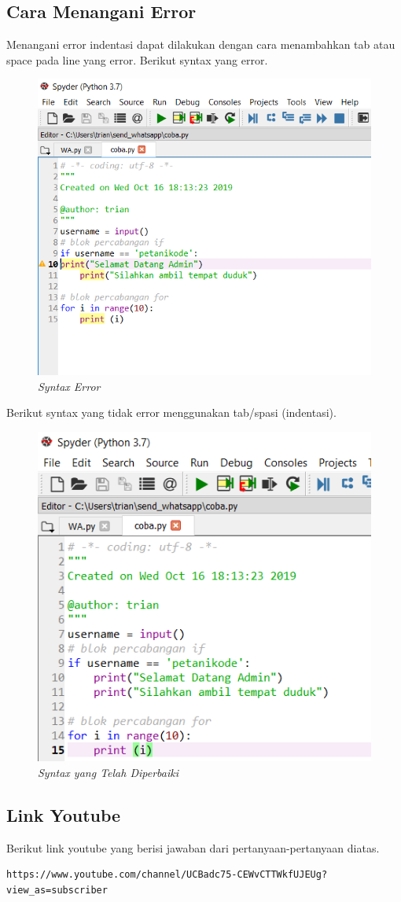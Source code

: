 \subsection{Cara Menangani Error}
Menangani error indentasi dapat dilakukan dengan cara menambahkan tab atau space pada line yang error.
Berikut syntax yang error.
\begin{figure}[H]
    \centering
    \includegraphics[scale=0.7]{figures/indentasi}
    \caption{\textit{Syntax Error}}
    \label{Syntax Error}
\end{figure}
Berikut syntax yang tidak error menggunakan tab/spasi (indentasi).
\begin{figure}[H]
    \centering
    \includegraphics[scale=0.7]{figures/indentasicoy}
    \caption{\textit{Syntax yang Telah Diperbaiki}}
    \label{Syntax Error}
\end{figure}

\subsection{Link Youtube}
Berikut link youtube yang berisi jawaban dari pertanyaan-pertanyaan diatas.
\begin{verbatim}
https://www.youtube.com/channel/UCBadc75-CEWvCTTWkfUJEUg?view_as=subscriber
\end{verbatim}
